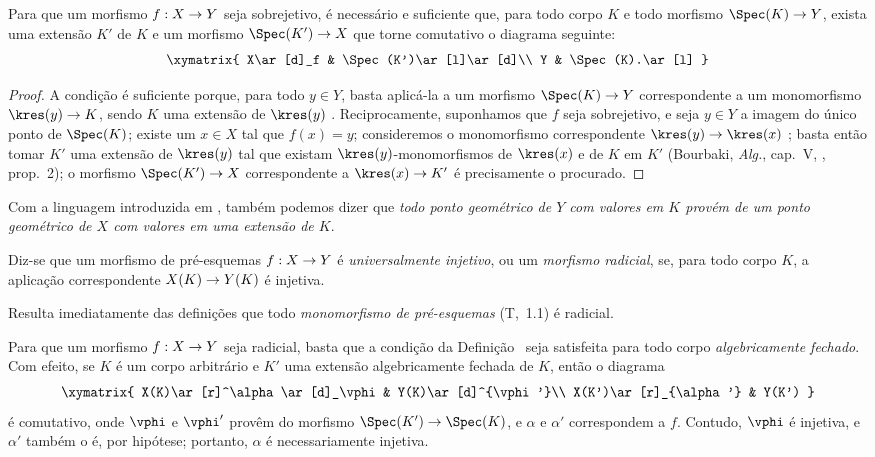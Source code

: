 \documentclass[oneside]{amsart}
\makeatletter
\newcommand{\ega@arrow}[2]{\mathchoice{#1}{#2}{#2}{#2}}
\renewcommand{\to}{\ega@arrow{\longrightarrow}{\rightarrow}}
\newcommand{\oldpage}[2][]{{\marginnote{\normalfont\textbf{#1}~|~#2}}\ignorespaces}
\let\EGAOriginalLabel\label
\renewcommand{\label}[1]{\phantomsection\EGAOriginalLabel{#1}}
\makeatother
\begin{document}
\begin{proposition}[3.5.3]
\label{I.3.5.3}
Para que um morfismo $f:X\to Y$ seja sobrejetivo, é necessário e suficiente
que, para todo corpo $K$ e todo morfismo $\Spec(K)\to Y$, exista uma extensão
$K'$ de $K$ e um morfismo $\Spec(K')\to X$ que torne comutativo o diagrama
seguinte:
\[
  \xymatrix{
    X\ar[d]_f &
    \Spec(K')\ar[l]\ar[d]\\
    Y &
    \Spec(K).\ar[l]
  }
\]
\end{proposition}

\begin{proof}
A condição é suficiente porque, para todo $y\in Y$, basta aplicá-la a um
morfismo $\Spec(K)\to Y$ correspondente a um monomorfismo
$\kres(y)\to K$, sendo $K$ uma extensão de $\kres(y)$ .
Reciprocamente, suponhamos que $f$ seja sobrejetivo, e seja $y\in Y$ a imagem
do único ponto de $\Spec(K)$; existe um $x\in X$ tal que $f(x)=y$;
consideremos o monomorfismo correspondente $\kres(y)\to\kres(x)$
; basta então tomar $K'$ uma extensão de $\kres(y)$ tal que
existam $\kres(y)$-monomorfismos de $\kres(x)$ e de $K$ em $K'$ (Bourbaki,
\emph{Alg.}, cap.~V, , prop.~2); o morfismo
$\Spec(K')\to X$ correspondente a $\kres(x)\to K'$ é precisamente o
procurado.
\end{proof}

Com a linguagem introduzida em , também podemos dizer que
\emph{todo ponto geométrico de $Y$ com valores em $K$ provém de um ponto
geométrico de $X$ com valores em uma extensão de $K$}.

\begin{definition}[3.5.4]
\label{I.3.5.4}
Diz-se que um morfismo de pré-esquemas $f:X\to Y$ é
\emph{universalmente injetivo}, ou um \emph{morfismo radicial}, se, para todo
corpo $K$, a aplicação correspondente $X(K)\to Y(K)$ é injetiva.
\end{definition}

Resulta imediatamente das definições que todo \emph{monomorfismo de
pré-esquemas} (T,~1.1) é radicial.

\begin{env}[3.5.5]
\label{I.3.5.5}
Para que um morfismo $f:X\to Y$ seja radicial, basta que a condição da
Definição~ seja satisfeita para todo corpo
\emph{algebricamente fechado}.
Com efeito, se $K$ é um corpo arbitrário e $K'$ uma extensão algebricamente
fechada de $K$, então o diagrama
\[
  \xymatrix{
    X(K)\ar[r]^\alpha\ar[d]_\vphi &
    Y(K)\ar[d]^{\vphi'}\\
    X(K')\ar[r]_{\alpha'} &
    Y(K')
  }
\]
\oldpage[I]{116}
é comutativo, onde $\vphi$ e $\vphi'$ provêm do morfismo
$\Spec(K')\to\Spec(K)$, e $\alpha$ e $\alpha'$ correspondem a $f$.
Contudo, $\vphi$ é injetiva, e $\alpha'$ também o é, por hipótese; portanto,
$\alpha$ é necessariamente injetiva.
\end{env}
\end{document}
